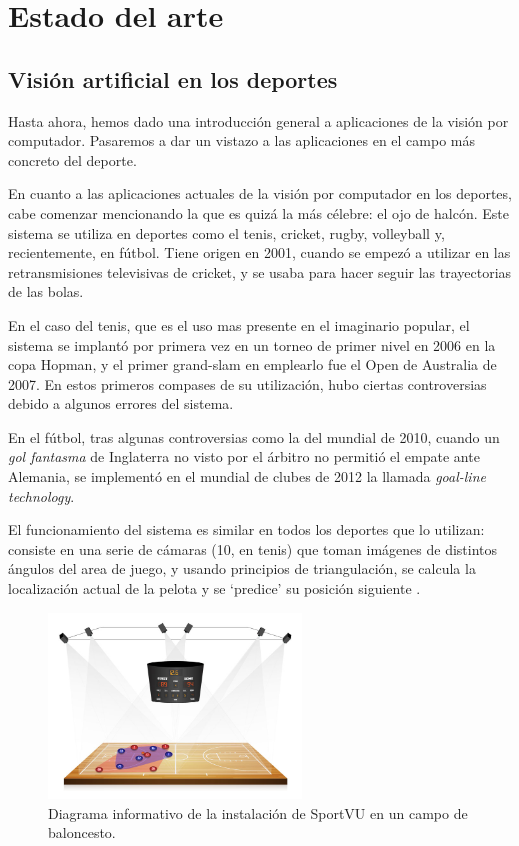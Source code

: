 \section{Estado del arte}


\subsection{Visión artificial en los deportes}
Hasta ahora, hemos dado una introducción general a aplicaciones de la visión por computador. Pasaremos a dar un vistazo a las aplicaciones en el campo más concreto del deporte.

En cuanto a las aplicaciones actuales de la visión por computador en los deportes, cabe comenzar mencionando la que es quizá la más célebre: el ojo de halcón. Este sistema se utiliza en deportes como el tenis, cricket, rugby, volleyball y, recientemente, en fútbol. Tiene origen en 2001, cuando se empezó a utilizar en las retransmisiones televisivas de cricket, y se usaba para hacer seguir las trayectorias de las bolas.

En el caso del tenis, que es el uso mas presente en el imaginario popular, el sistema se implantó por primera vez en un torneo de primer nivel en 2006 en la copa Hopman, y el primer grand-slam en emplearlo fue el Open de Australia de 2007. En estos primeros compases de su utilización, hubo ciertas controversias debido a algunos errores del sistema.

En el fútbol, tras algunas controversias como la del mundial de 2010, cuando un \textit{gol fantasma} de Inglaterra no visto por el árbitro no permitió el empate ante Alemania, se implementó en el mundial de clubes de 2012 la llamada \textit{goal-line technology}.

El funcionamiento del sistema es similar en todos los deportes que lo utilizan: consiste en una serie de cámaras (10, en tenis) que toman imágenes de distintos ángulos del area de juego, y usando principios de triangulación, se calcula la localización actual de la pelota y se `predice' su posición siguiente \cite{wiki:hawk}.

\begin{figure}
    \centering
    \includegraphics[width=0.6\textwidth]{images/sportVU}
    \caption{Diagrama informativo de la instalación de SportVU en un campo de baloncesto.}
    \label{fig:sportVU}
\end{figure}

